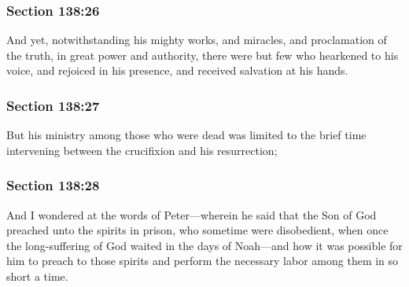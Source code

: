 	\subsubsection{Section 138:26} %
		\label{DC138-26}

		And yet, notwithstanding his mighty works, and miracles, and proclamation of the truth, in great power and authority, there were but few who hearkened to his voice, and rejoiced in his presence, and received salvation at his hands.


	\subsubsection{Section 138:27} %
		\label{DC138-27}

		But his ministry among those who were dead was limited to the brief time intervening between the crucifixion and his resurrection;


	\subsubsection{Section 138:28} %
		\label{DC138-28}

		And I wondered at the words of Peter—wherein he said that the Son of God preached unto the spirits in prison, who sometime were disobedient, when once the long-suffering of God waited in the days of Noah—and how it was possible for him to preach to those spirits and perform the necessary labor among them in so short a time.

